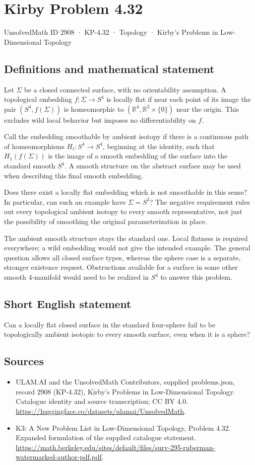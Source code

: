 \documentclass[11pt,a4paper]{article}
\begin{document}
\section*{Kirby Problem 4.32}\label{2908}
{\small UnsolvedMath ID 2908 · KP-4.32 · Topology · Kirby's Problems in Low-Dimensional Topology}
\subsection{Definitions and mathematical statement}
Let $\Sigma$ be a closed connected surface, with no orientability
assumption. A topological embedding $f:\Sigma\to S^4$ is locally
flat if near each point of its image the pair $(S^4,f(\Sigma))$ is
homeomorphic to $(\mathbb R^4,\mathbb R^2\times\{0\})$ near the
origin. This excludes wild local behavior but imposes no differentiability
on $f$.

Call the embedding smoothable by ambient isotopy if there is a
continuous path of homeomorphisms $H_t:S^4\to S^4$, beginning at
the identity, such that $H_1(f(\Sigma))$ is the image of a smooth
embedding of the surface into the standard smooth $S^4$.
A smooth structure on the abstract surface may be used when describing
this final smooth embedding.

Does there exist a locally flat embedding which is not smoothable
in this sense? In particular, can such an example have $\Sigma=S^2$?
The negative requirement rules out every topological ambient isotopy
to every smooth representative, not just the possibility of smoothing
the original parameterization in place.

The ambient smooth structure stays the standard one. Local flatness
is required everywhere; a wild embedding would not give the intended
example. The general question allows all closed surface types, whereas
the sphere case is a separate, stronger existence request. Obstructions
available for a surface in some other smooth $4$-manifold would need
to be realized in $S^4$ to answer this problem.
\subsection{Short English statement}
Can a locally flat closed surface in the standard four-sphere fail to be topologically ambient isotopic to every smooth surface, even when it is a sphere?
\subsection{Sources}
\begin{itemize}
\item[S1] ULAM.AI and the UnsolvedMath Contributors, supplied problems.json, record 2908 (KP-4.32), Kirby's Problems in Low-Dimensional Topology. Catalogue identity and source transcription; CC BY 4.0.
\url{https://huggingface.co/datasets/ulamai/UnsolvedMath}.
\item[S2] K3: A New Problem List in Low-Dimensional Topology, Problem 4.32. Expanded formulation of the supplied catalogue statement.
\url{https://math.berkeley.edu/sites/default/files/surv-295-ruberman-watermarked-author-pdf.pdf}.
\end{itemize}
\end{document}
